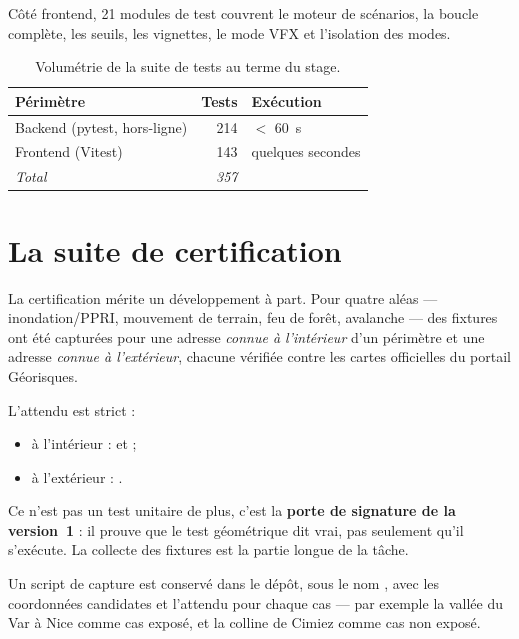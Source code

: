 Côté frontend, 21 modules de test couvrent le moteur de scénarios, la boucle
complète, les seuils, les vignettes, le mode VFX et l'isolation des modes.

\begin{table}[H]
\centering
\small
\caption{Volumétrie de la suite de tests au terme du stage.}
\label{tab:tests-vol}
\begin{tabular}{@{}l r l@{}}
\toprule
\textbf{Périmètre} & \textbf{Tests} & \textbf{Exécution} \\
\midrule
Backend (pytest, hors-ligne) & 214 & $<$ 60~s \\
Frontend (Vitest) & 143 & quelques secondes \\
\addlinespace
\emph{Total} & \emph{357} & \\
\bottomrule
\end{tabular}
\end{table}

\section{La suite de certification}

La certification  mérite un développement à part. Pour quatre aléas —
inondation/PPRI, mouvement de terrain, feu de forêt, avalanche — des fixtures
ont été capturées pour une adresse \emph{connue à l'intérieur} d'un périmètre
et une adresse \emph{connue à l'extérieur}, chacune vérifiée contre les cartes
officielles du portail Géorisques.

L'attendu est strict :

\begin{itemize}[leftmargin=1.4em]
  \item à l'intérieur :  et
         ;
  \item à l'extérieur : .
\end{itemize}

Ce n'est pas un test unitaire de plus, c'est la \textbf{porte de signature de
la version~1} : il prouve que le test géométrique dit vrai, pas seulement qu'il
s'exécute. La collecte des fixtures est la partie longue de la tâche.

Un script de capture est conservé dans le dépôt, sous le nom
, avec les
coordonnées candidates et l'attendu pour chaque cas — par exemple la vallée du
Var à Nice comme cas exposé, et la colline de Cimiez comme cas non exposé.

